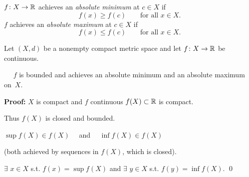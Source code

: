 \documentclass[10pt,aspectratio=149]{beamer}
\begin{document}
\begin{frame}

$f \colon X \to {\mathbb{R}}$ achieves an
\emph{absolute minimum} at $c \in X$ if
\begin{equation*}
f(x) \geq f(c) \qquad \text{for all } x \in X.
\end{equation*}
\pause
$f$ achieves an 
\emph{absolute maximum} at $c \in X$ if
\begin{equation*}
f(x) \leq f(c) \qquad \text{for all } x \in X.
\end{equation*}

\pause
\begin{theorem}
Let $(X,d)$ be a nonempty compact metric space
and let $f \colon X \to {\mathbb{R}}$ be continuous.

\pause
\thus ~~
$f$ is bounded and
achieves an absolute minimum and an absolute maximum on~$X$.
\end{theorem}

\pause
\textbf{Proof:}
$X$ is compact and $f$ continuous
\pause
\wthus
$f(X) \subset {\mathbb{R}}$ is compact.

\pause
Thus $f(X)$ is closed and bounded.

\pause
\thus \quad $\sup f(X) \in f(X)$ ~~and~~ $\inf f(X) \in f(X)$

(both achieved by sequences in $f(X)$, which is closed).

\pause
\medskip

\thus
\quad $\exists$ $x \in X$ s.t. $f(x) = \sup f(X)$
\pause
\quad and \quad
$\exists$ $y \in X$ s.t. $f(y) = \inf f(X)$.
\qed

\end{frame}
\end{document}
